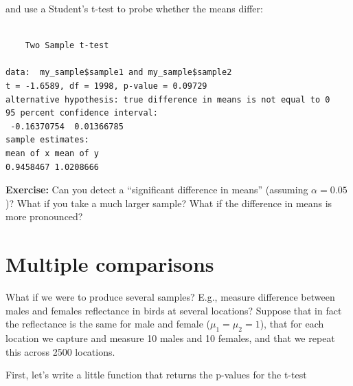 \documentclass[
  letterpaper,
  DIV=11,
  numbers=noendperiod]{scrreprt}
\newenvironment{Shaded}{\begin{snugshade}}{\end{snugshade}}
\newcommand{\AttributeTok}[1]{\textcolor[rgb]{0.40,0.45,0.13}{#1}}
\newcommand{\CommentTok}[1]{\textcolor[rgb]{0.37,0.37,0.37}{#1}}
\newcommand{\ConstantTok}[1]{\textcolor[rgb]{0.56,0.35,0.01}{#1}}
\newcommand{\ControlFlowTok}[1]{\textcolor[rgb]{0.00,0.23,0.31}{#1}}
\newcommand{\FunctionTok}[1]{\textcolor[rgb]{0.28,0.35,0.67}{#1}}
\newcommand{\NormalTok}[1]{\textcolor[rgb]{0.00,0.23,0.31}{#1}}
\newcommand{\OtherTok}[1]{\textcolor[rgb]{0.00,0.23,0.31}{#1}}
\newcommand{\SpecialCharTok}[1]{\textcolor[rgb]{0.37,0.37,0.37}{#1}}
\begin{document}
and use a Student's t-test to probe whether the means differ:

\begin{Shaded}
\end{Shaded}

\begin{verbatim}

    Two Sample t-test

data:  my_sample$sample1 and my_sample$sample2
t = -1.6589, df = 1998, p-value = 0.09729
alternative hypothesis: true difference in means is not equal to 0
95 percent confidence interval:
 -0.16370754  0.01366785
sample estimates:
mean of x mean of y 
0.9458467 1.0208666 
\end{verbatim}

\textbf{Exercise:} Can you detect a ``significant difference in means''
(assuming \(\alpha = 0.05\))? What if you take a much larger sample?
What if the difference in means is more pronounced?

\hypertarget{multiple-comparisons}{%
\section{Multiple comparisons}\label{multiple-comparisons}}

What if we were to produce several samples? E.g., measure difference
between males and females reflectance in birds at several locations?
Suppose that in fact the reflectance is the same for male and female
(\(\mu_1 = \mu_2 = 1\)), that for each location we capture and measure
10 males and 10 females, and that we repeat this across 2500 locations.

First, let's write a little function that returns the p-values for the
t-test

\begin{Shaded}
\end{Shaded}
\end{document}
